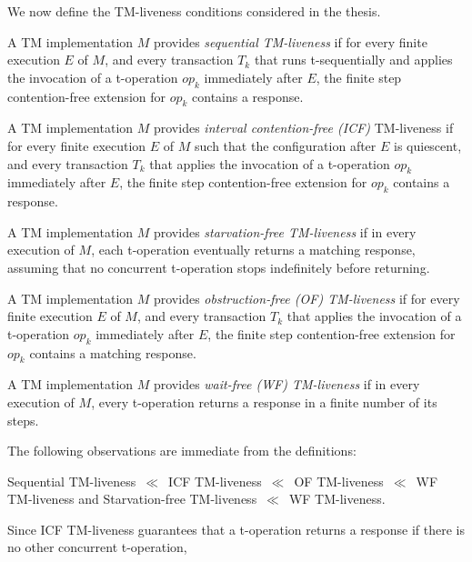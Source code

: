 We now define the TM-liveness conditions considered in the thesis.
\begin{definition}
A TM implementation $M$ provides \emph{sequential TM-liveness} if for every finite execution $E$ of $M$, 
and every transaction $T_k$ that runs t-sequentially and applies the invocation of a t-operation $op_k$ immediately after $E$, 
the finite step contention-free extension for $op_k$ contains a response.
\end{definition}
\begin{definition}
A TM implementation $M$ provides \emph{interval contention-free (ICF)} TM-liveness
if for every finite execution $E$ of $M$ such that the configuration after $E$ is quiescent, 
and every transaction $T_k$ that applies the invocation of a t-operation $op_k$ immediately after $E$, 
the finite step contention-free extension for $op_k$ contains a response.
\end{definition}
\begin{definition}
A TM implementation $M$ provides \emph{starvation-free TM-liveness} if in every execution of $M$, each t-operation 
eventually returns a matching response, assuming that no concurrent t-operation stops indefinitely before returning.  
\end{definition}
\begin{definition}
A TM implementation $M$ provides \emph{obstruction-free (OF) TM-liveness} if for every finite execution $E$ of $M$, 
and every transaction $T_k$ that applies the invocation of a t-operation $op_k$ immediately after $E$, 
the finite step contention-free extension for $op_k$ contains a matching response.
\end{definition}
\begin{definition}
A TM implementation $M$ provides \emph{wait-free (WF) TM-liveness} if
in every execution of $M$, every t-operation returns a response in a finite number of its steps.
\end{definition}
The following observations are immediate from the definitions:
\begin{observation}
Sequential TM-liveness~$\ll$~ICF TM-liveness~$\ll$~OF TM-liveness~$\ll$~WF TM-liveness
and
Starvation-free TM-liveness~$\ll$~WF TM-liveness.
\end{observation}
Since ICF TM-liveness guarantees that a t-operation returns a response if there is no other concurrent t-operation,
